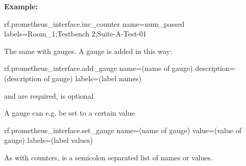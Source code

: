 \vspace{2ex}

\textbf{Example:}

\begin{robotcode}
rf.prometheus_interface.inc_counter    name=num_passed    labels=Room_1;Testbench 2;Suite-A-Test-01
\end{robotcode}

\vspace{2ex}

The same with gauges. A gauge is added in this way:

\begin{robotcode}
rf.prometheus_interface.add_gauge    name=(name of gauge)     description=(description of gauge)     labels=(label names)
\end{robotcode}

 and  are required,  is optional.

\vspace{2ex}

A gauge can e.g. be set to a certain value

\begin{robotcode}
rf.prometheus_interface.set_gauge    name=(name of gauge)    value=(value of gauge)    labels=(label values)
\end{robotcode}

As with counters,  is a semicolon separated list of names or values.











